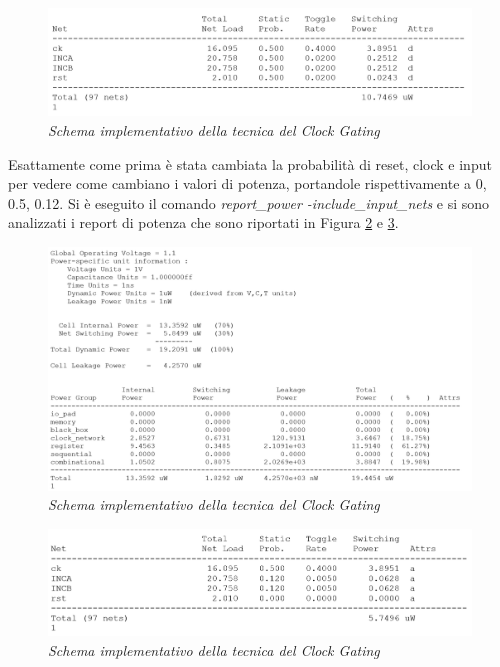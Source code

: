 \begin{figure}[!htb]
	\centering
	\includegraphics[scale=0.65]{immagini/3_8}
	\caption{\textit{Schema implementativo della tecnica del Clock Gating}}
	\label{3_8}
\end{figure}
\newpage
Esattamente come prima è stata cambiata la probabilità di reset, clock e input per vedere come cambiano i valori di potenza, portandole rispettivamente a 0, 0.5, 0.12.
Si è eseguito il comando \textit{report\_power -include\_input\_nets} e si sono analizzati i report di potenza che sono riportati in Figura \ref{3_9} e \ref{3_10}.\\
\begin{figure}[!htb]
	\centering
	\includegraphics[scale=0.65]{immagini/3_9}
	\caption{\textit{Schema implementativo della tecnica del Clock Gating}}
	\label{3_9}
\end{figure}
\begin{figure}[!htb]
	\centering
	\includegraphics[scale=0.65]{immagini/3_10}
	\caption{\textit{Schema implementativo della tecnica del Clock Gating}}
	\label{3_10}
\end{figure}
\newpage

